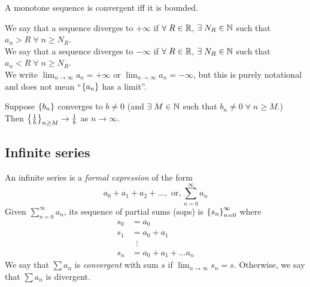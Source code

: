 \documentclass[12pt]{article}
\begin{document}
\begin{thm} \label{thm:sequence:MCT}
    A monotone sequence is convergent iff it is bounded.
\end{thm}

\begin{defn} \label{defn:sequence:diverging_to_infinity}
    We say that a sequence diverges to $+\infty$ if $\forall\; R \in \mathbb{R}$, $\exists\; N_{R} \in \mathbb{N}$ such that $a_{n} > R \;\forall\; n \geq N_{R}$. \\
    We say that a sequence diverges to $-\infty$ if $\forall\; R \in \mathbb{R}$, $\exists\; N_{R} \in \mathbb{N}$ such that $a_{n} < R \;\forall\; n \geq N_{R}$. \\
    We write $\lim_{n \to \infty} a_{n} = +\infty$ or $\lim_{n \to \infty} a_{n} = -\infty$, but this is purely notational and does not mean ``$\set{a_{n}}$ has a limit''.
\end{defn}

\begin{thm} \label{thm:sequence:reciprocal_limit}
    Suppose $\set{b_{n}}$ converges to $b \neq 0$ (and $\exists\; M \in \mathbb{N}$ such that $b_{n} \neq 0 \;\forall\; n \geq M$.) \\
    Then $\set{\frac{1}{b}}_{n \geq M} \to \frac{1}{b}$ as $n \to \infty$.
\end{thm}

\subsection{Infinite series}

\begin{defn} \label{defn:series}
    An infinite series is a \emph{formal expression} of the form \[
        a_{0} + a_{1} + a_{2} + \dots, \text{ or}, \sum_{n=0}^{\infty} a_{n}
    \]
    Given $\sum_{n=0}^{\infty} a_{n}$, its sequence of partial sums (sops) is $\set{s_{n}}_{n=0}^{\infty}$ where
    \begin{align*}
        s_{0} &= a_{0} \\
        s_{1} &= a_{0} + a_{1} \\
        &\;\;\vdots \\
        s_{n} &= a_{0} + a_{1} + \dots a_{n}
    \end{align*}
    We say that $\sum a_{n}$ is \emph{convergent} with sum $s$ if $\lim_{n \to \infty} s_{n} = s$. Otherwise, we say that $\sum a_{n}$ is divergent.
\end{defn}
\end{document}
